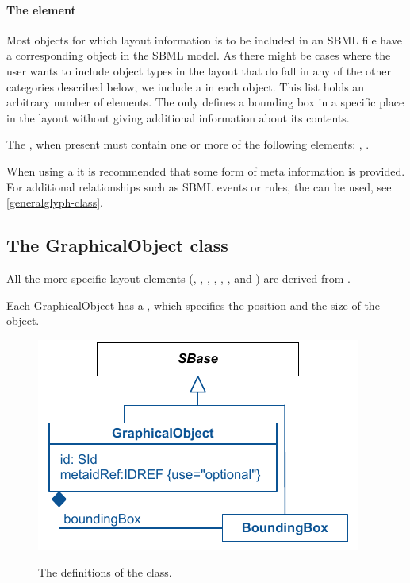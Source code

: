 \paragraph{The  element}
\label{listofadditionalgraphicalobjects-class}
Most objects for which layout information is to be included in an SBML 
file have a corresponding object in the SBML model. As there might be 
cases where the user wants to include object types in the layout that do 
fall in any of the other categories described below, we include a 
 in each \Layout object. This 
list holds an arbitrary number of  elements. The 
 only defines a bounding box in a specific place 
in the layout without giving additional information about its contents. 

The , when present must contain 
one or more of the following elements: \GraphicalObject, \GeneralGlyph. 

When using a \GraphicalObject it is recommended that some form of meta 
information is provided. For additional relationships such as SBML events or rules, the \GeneralGlyph can be used, see \ref{generalglyph-class}. 


\subsection{The GraphicalObject class} 
\label{graphicalobject-class}
All the more specific layout elements (\CompartmentGlyph, \GeneralGlyph, 
\SpeciesGlyph, \ReactionGlyph, \ReferenceGlyph, \TextGlyph, and 
\SpeciesReferenceGlyph) are derived from \GraphicalObject. 

Each GraphicalObject has a \BoundingBox, which specifies the position 
and the size of the object. 


\begin{figure}[!h]
\includegraphics{uml/layout-graphicalobject-uml}\\
\label{uml:graphicalobject}
\caption{The definitions of the \GraphicalObject class.}
\end{figure}

